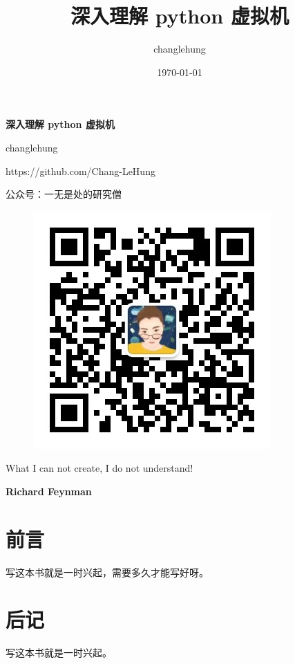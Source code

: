 \documentclass[11pt]{book}
\title{\textbf{深入理解 python 虚拟机}}
\author{changlehung \affil{单位1}}
\date{\today}
\theoremstyle{mytheoremstyle}
\begin{document}
\begin{titlepage}
    \vspace{5pt}
    \begin{center}

        {\Huge\textbf{深入理解 python 虚拟机}}
        
        \vspace{1cm}
        {\Large{changlehung}}
        
        \vspace{1cm}
        {\large{https://github.com/Chang-LeHung}}
    
        \vspace{3cm}
        {\Large{公众号：一无是处的研究僧}}
    \end{center}
    \begin{figure}[H]
      \centering
      \includegraphics[scale=.5]{qrcode.jpg}
    \end{figure}
    \epigraph{{\color{myblue} What I can not create, I do not understand!}}{\textbf{Richard Feynman}}
\end{titlepage}



\tableofcontents

\frontmatter %

\chapter{前言}
写这本书就是一时兴起，需要多久才能写好呀。

\mainmatter %




\backmatter %

\chapter{后记}
写这本书就是一时兴起。
\end{document}
